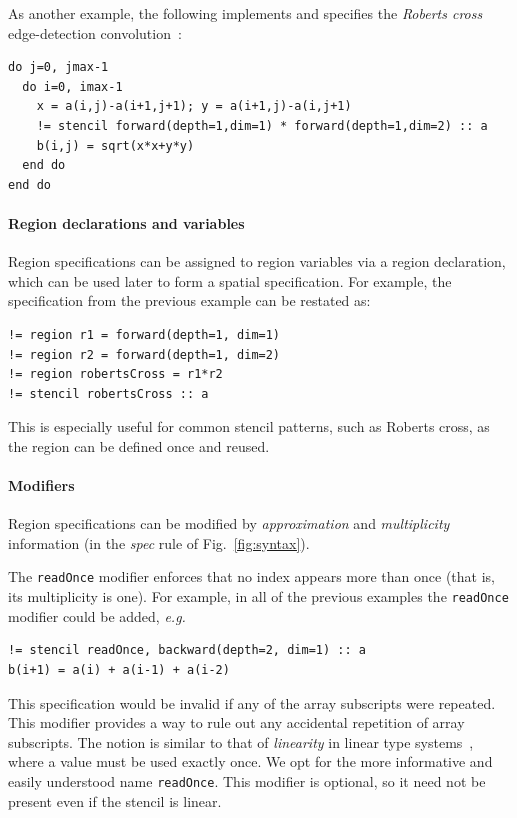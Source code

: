 \documentclass[9pt]{sigplanconf}
\theoremstyle{definition}
\newcommand{\eg}{\emph{e.g.}}
\begin{document}
As another example, the following
implements and specifies the \emph{Roberts cross}
edge-detection convolution~\cite{davis1975survey}:
\begin{verbatim}
do j=0, jmax-1
  do i=0, imax-1
    x = a(i,j)-a(i+1,j+1); y = a(i+1,j)-a(i,j+1)
    != stencil forward(depth=1,dim=1) * forward(depth=1,dim=2) :: a
    b(i,j) = sqrt(x*x+y*y)
  end do
end do
\end{verbatim}

\paragraph{Region declarations and variables}

Region specifications can be assigned to region variables via
a region declaration, which can be used later to form a spatial
specification. For example, the specification from the previous
 example can be restated as:
\begin{verbatim}
!= region r1 = forward(depth=1, dim=1)
!= region r2 = forward(depth=1, dim=2)
!= region robertsCross = r1*r2
!= stencil robertsCross :: a
\end{verbatim}
This is especially useful for common stencil patterns, such as Roberts cross,
as the region can be defined once and reused.
\paragraph{Modifiers}
Region specifications can be modified 
by \emph{approximation} and \emph{multiplicity} information 
(in the \textit{spec} rule of Fig.~\ref{fig:syntax}). 

The \texttt{readOnce} modifier enforces that no index appears more
than once (that is, its multiplicity is one). For example, in all of
the previous examples the \texttt{readOnce} modifier could be added,
\eg{}
%
\begin{verbatim}
!= stencil readOnce, backward(depth=2, dim=1) :: a
b(i+1) = a(i) + a(i-1) + a(i-2)
\end{verbatim}
%
This specification would be invalid if any of the
array subscripts were repeated. This modifier provides a way to
rule out any accidental repetition of array subscripts.
The notion is similar to that of \emph{linearity} in linear type
systems~\cite{wadler1990linear}, where a value must be used
exactly once. We opt for the more informative and easily understood name
\texttt{readOnce}. This modifier is optional, so it need not
be present even if the stencil is linear.
\end{document}
